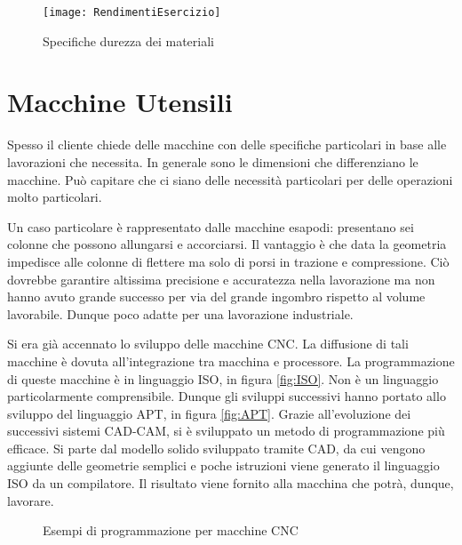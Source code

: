 \begin{figure}
\centering
\texttt{[image: RendimentiEsercizio]}
\caption{Specifiche durezza dei materiali}
\label{fig:RendimentiEsercizio}
\end{figure}

\chapter{Macchine Utensili}\label{chp:MacchineUtensili}
Spesso il cliente chiede delle macchine con delle specifiche particolari
in base alle lavorazioni che necessita.
In generale sono le dimensioni che differenziano le macchine.
Può capitare che ci siano delle necessità particolari per delle operazioni 
molto particolari.

Un caso particolare è rappresentato dalle macchine esapodi: presentano sei colonne che possono allungarsi e accorciarsi. Il vantaggio è che data la geometria impedisce alle colonne di flettere ma solo di porsi in trazione e compressione.
Ciò dovrebbe garantire altissima precisione e accuratezza nella lavorazione ma non hanno avuto grande successo per via del grande ingombro rispetto al volume lavorabile. Dunque poco adatte per una lavorazione industriale.

Si era già accennato lo sviluppo delle macchine \ac{CNC}.
La diffusione di tali macchine è dovuta all'integrazione tra macchina e 
processore. La programmazione di queste macchine è in linguaggio ISO, in figura \ref{fig:ISO}.
Non è un linguaggio particolarmente comprensibile. Dunque gli sviluppi successivi hanno portato allo sviluppo del linguaggio APT, in figura \ref{fig:APT}.
Grazie all'evoluzione dei successivi sistemi CAD-CAM, si è sviluppato un metodo di programmazione più efficace. Si parte dal modello solido sviluppato tramite CAD, da cui vengono aggiunte delle geometrie semplici e poche istruzioni viene generato il linguaggio ISO da un compilatore.
Il risultato viene fornito alla macchina che potrà, dunque, lavorare.

\begin{figure}
\centering
{}\quad
{}
\caption{Esempi di programmazione per macchine CNC}
\label{fig:CNC}
\end{figure}

